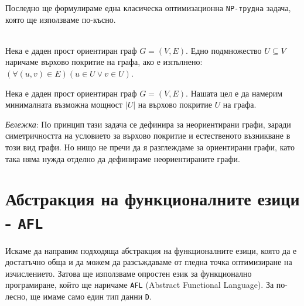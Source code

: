 \documentclass[12pt,twoside,a4paper]{article}
\begin{document}
	Последно ще формулираме една класическа оптимизационна \texttt{NP-трудна} задача, която ще използваме по-късно.
	
	\begin{definition}~\\
		\indent Нека е даден прост ориентиран граф $G=(V,E)$. Едно подмножество $U \subseteq V$ наричаме върхово покритие на графа, ако е изпълнено: $(\forall (u,v) \in E)(u \in U \lor v \in U)$.
	\end{definition}
	
	\begin{problem} Нека е даден прост ориентиран граф $G=(V,E)$. Нашата цел е да намерим минималната възможна мощност $|U|$ на върхово покритие $U$ на графа.
		
		\textit{Бележка}: По принцип тази задача се дефинира за неориентирани графи, заради симетричността на условието за върхово покритие и естественото възникване в този вид графи. Но нищо не пречи да я разглеждаме за ориентирани графи, като така няма нужда отделно да дефинираме неориентираните графи.
	\end{problem}
	
	\newpage
	
	
	\section{Абстракция на функционалните езици - \texttt{AFL}}
	Искаме да направим подходяща абстракция на функционалните езици, която да е достатъчно обща и да можем да разсъждаваме от гледна точка оптимизиране на изчислението. Затова ще използваме опростен език за функционално програмиране, който ще наричаме \texttt{AFL} (Abstract Functional Language). За по-лесно, ще имаме само един тип данни \texttt{D}.
	
\end{document}
